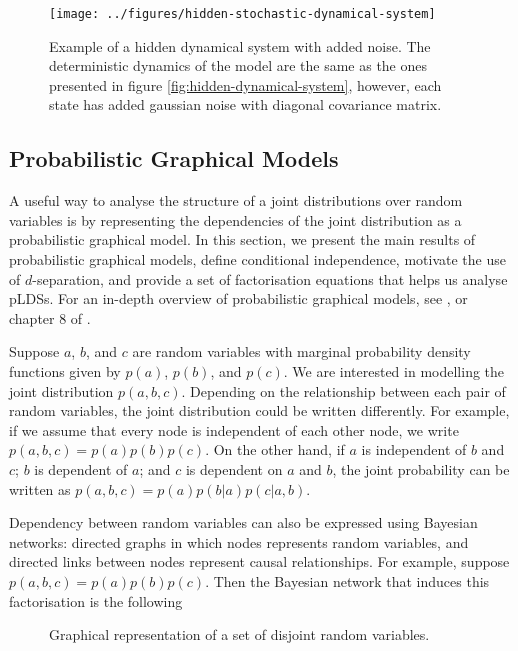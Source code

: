 \documentclass[11pt]{article}
\numberwithin{equation}{section}
\begin{document}
\begin{figure}[h!]
	\centering
	\texttt{[image: ../figures/hidden-stochastic-dynamical-system]}
	\caption{Example of a hidden dynamical system with added noise. The deterministic dynamics of the model are the same as the ones presented in figure \ref{fig:hidden-dynamical-system}, however, each state has added gaussian noise with diagonal covariance matrix.}
	\label{fig:hidden-noisy-dynamical-system}
\end{figure}


\subsection{Probabilistic Graphical Models}
A useful way to analyse the structure of a joint distributions over random variables is by representing the dependencies of the joint distribution as a probabilistic graphical model. In this section, we present the main results of probabilistic graphical models, define conditional independence, motivate the use of $d$-separation, and provide a set of factorisation equations that helps us analyse pLDSs. For an in-depth overview of probabilistic graphical models, see \cite{koller2009}, or chapter 8 of \cite{prml}.

Suppose $a$, $b$, and $c$ are random variables with marginal probability density functions given by $p(a)$, $p(b)$, and $p(c)$. We are interested in modelling the joint distribution $p(a,b,c)$. Depending on the relationship between each pair of random variables, the joint distribution could be written differently. For example, if we assume that every node is independent of each other node, we write $p(a,b,c) = p(a) p(b) p(c)$. On the other hand, if $a$ is independent of $b$ and $c$; $b$ is dependent of $a$; and $c$ is dependent on $a$ and $b$, the joint probability can be written as $p(a,b,c) = p(a) p(b \vert a) p(c \vert a, b)$.

Dependency between random variables can also be expressed using Bayesian networks: directed graphs in which nodes represents random variables, and directed links between nodes represent causal relationships. For example, suppose $p(a,b,c) = p(a)p(b)p(c)$. Then the Bayesian network that induces this factorisation is the following

\begin{figure}[h!]
	\centering
	
	\caption{Graphical representation of a set of disjoint random variables.}
	\label{fig:lds-gm}
\end{figure}
\end{document}
